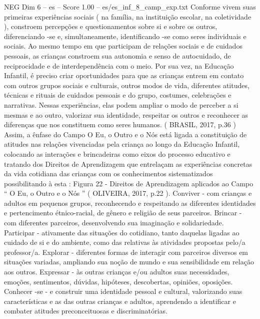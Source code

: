 \begin{textsample}{NEG Dim 6 – es – Score 1.00 – es/es\_inf\_8\_camp\_exp.txt}
Conforme vivem suas primeiras experiências sociais ( na família, na instituição escolar, na coletividade ), constroem percepções e questionamentos sobre si e sobre os outros, diferenciando -se e, simultaneamente, identificando -se como seres individuais e sociais.
Ao mesmo tempo em que participam de relações sociais e de cuidados pessoais, as crianças constroem sua autonomia e senso de autocuidado, de reciprocidade e de interdependência com o meio.
Por sua vez, na Educação Infantil, é preciso criar oportunidades para que as crianças entrem em contato com outros grupos sociais e culturais, outros modos de vida, diferentes atitudes, técnicas e rituais de cuidados pessoais e do grupo, costumes, celebrações e narrativas.
Nessas experiências, elas podem ampliar o modo de perceber a si mesmas e ao outro, valorizar sua identidade, respeitar os outros e reconhecer as diferenças que nos constituem como seres humanos. ( BRASIL, 2017, p.36 ) Assim, a ênfase do Campo O Eu, o Outro e o Nós está ligada a constituição de atitudes nas relações vivenciadas pela criança ao longo da Educação Infantil, colocando as interações e brincadeiras como eixos do processo educativo e tratando dos Direitos de Aprendizagem que entrelaçam as experiências concretas da vida cotidiana das crianças com os conhecimentos sistematizados possibilitando à esta : Figura 22 - Direitos de Aprendizagem aplicados ao Campo “ O Eu, o Outro e o Nós ” ( OLIVEIRA, 2017, p.22 ).
Conviver - com crianças e adultos em pequenos grupos, reconhecendo e respeitando as diferentes identidades e pertencimento étnico-racial, de gênero e religião de seus parceiros.
Brincar - com diferentes parceiros, desenvolvendo sua imaginação e solidariedade.
Participar - ativamente das situações do cotidiano, tanto daquelas ligadas ao cuidado de si e do ambiente, como das relativas às atividades propostas pelo/a professor/a.
Explorar - diferentes formas de interagir com parceiros diversos em situações variadas, ampliando sua noção de mundo e sua sensibilidade em relação aos outros.
Expressar - às outras crianças e/ou adultos suas necessidades, emoções, sentimentos, dúvidas, hipóteses, descobertas, opiniões, oposições.
Conhecer -se - e construir uma identidade pessoal e cultural, valorizando suas características e as das outras crianças e adultos, aprendendo a identificar e combater atitudes preconceituosas e discriminatórias.

\end{textsample}
